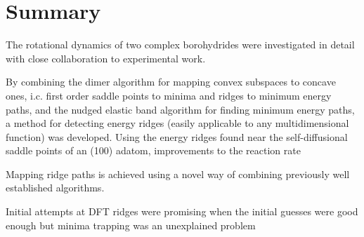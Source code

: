 \chapter{Summary}
\label{chap:summary}

The rotational dynamics of two complex borohydrides were investigated in detail with close collaboration to experimental work.

By combining the dimer algorithm for mapping convex subspaces to concave ones, i.c. first order saddle points to minima and ridges to minimum energy paths, and the nudged elastic band algorithm for finding minimum energy paths, a method for detecting energy ridges (easily applicable to any multidimensional function) was developed.
Using the energy ridges found near the self-diffusional saddle points of an (100) adatom, improvements to the reaction rate \expand


\bit
\item Mapping ridge paths is achieved using a novel way of combining previously well established  algorithms.
\item \expand
\item Initial attempts at DFT ridges were promising when the initial guesses were good enough but minima trapping was an unexplained problem
\eit

\placeholder








